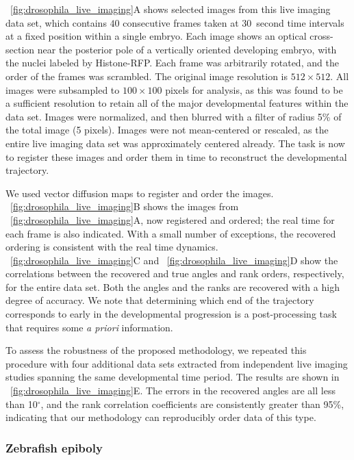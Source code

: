 \fig~\ref{fig:drosophila_live_imaging}A shows selected images from this live imaging data set, which contains $40$ consecutive frames taken at $30$~second time intervals at a fixed position within a single embryo.
%
Each image shows an optical cross-section near the posterior pole of a vertically oriented developing embryo, with the nuclei labeled by Histone-RFP.
%
Each frame was arbitrarily rotated, and the order of the frames was scrambled.
%
The original image resolution is $512 \times 512$.
%
All images were subsampled to $100 \times 100$ pixels for analysis, as this was found to be a sufficient resolution to retain all of the major developmental features within the data set. 
%
Images were normalized, and then blurred with a filter of radius 5\% of the total image (5 pixels). 
%
Images were not mean-centered or rescaled, as the entire live imaging data set was approximately centered already.
%
The task is now to register these images and order them in time to reconstruct the developmental trajectory.

We used vector diffusion maps to register and order the images.
%
\fig~\ref{fig:drosophila_live_imaging}B shows the images from \fig~\ref{fig:drosophila_live_imaging}A, now registered and ordered; the real time for each frame is also indicated.
%
With a small number of exceptions, the recovered ordering is consistent with the real time dynamics.
%
\fig~\ref{fig:drosophila_live_imaging}C and \fig~\ref{fig:drosophila_live_imaging}D  show the correlations between the recovered and true angles and rank orders, respectively, for the entire data set.
%
Both the angles and the ranks are recovered with a high degree of accuracy.
%
We note that determining which end of the trajectory corresponds to early in the developmental progression is a post-processing task that requires some {\em a priori} information. 

To assess the robustness of the proposed methodology, we repeated this procedure with four additional data sets extracted from independent live imaging studies spanning the same developmental time period.
%
The results are shown in \fig~\ref{fig:drosophila_live_imaging}E.
%
The errors in the recovered angles are all less than 10$^\circ$, and the rank correlation coefficients are consistently greater than 95\%, indicating that our methodology can reproducibly order data of this type.


\subsubsection{Zebrafish epiboly}

